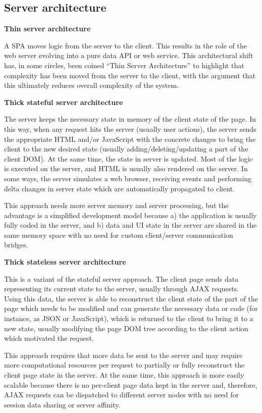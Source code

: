 \subsection{Server architecture}

\textbf{Thin server architecture}

A SPA moves logic from the server to the client. This results in the role of the web server evolving into a pure data API or web service. This architectural shift has, in some circles, been coined ``Thin Server Architecture'' to highlight that complexity has been moved from the server to the client, with the argument that this ultimately reduces overall complexity of the system.

\textbf{Thick stateful server architecture}

The server keeps the necessary state in memory of the client state of the page. In this way, when any request hits the server (usually user actions), the server sends the appropriate HTML and/or JavaScript with the concrete changes to bring the client to the new desired state (usually adding/deleting/updating a part of the client DOM). At the same time, the state in server is updated. Most of the logic is executed on the server, and HTML is usually also rendered on the server. In some ways, the server simulates a web browser, receiving events and performing delta changes in server state which are automatically propagated to client.

This approach needs more server memory and server processing, but the advantage is a simplified development model because a) the application is usually fully coded in the server, and b) data and UI state in the server are shared in the same memory space with no need for custom client/server communication bridges.

\textbf{Thick stateless server architecture}

This is a variant of the stateful server approach. The client page sends data representing its current state to the server, usually through AJAX requests. Using this data, the server is able to reconstruct the client state of the part of the page which needs to be modified and can generate the necessary data or code (for instance, as JSON or JavaScript), which is returned to the client to bring it to a new state, usually modifying the page DOM tree according to the client action which motivated the request.

This approach requires that more data be sent to the server and may require more computational resources per request to partially or fully reconstruct the client page state in the server. At the same time, this approach is more easily scalable because there is no per-client page data kept in the server and, therefore, AJAX requests can be dispatched to different server nodes with no need for session data sharing or server affinity. \cite{arc_over}